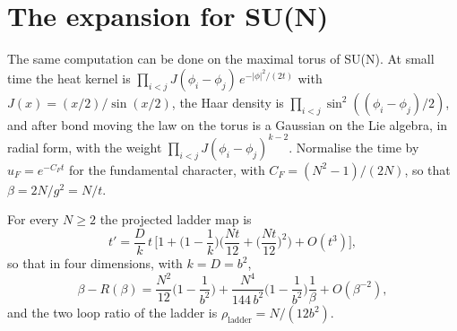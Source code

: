 \section{The expansion for SU(N)}

The same computation can be done on the maximal torus of SU(N). At small time the heat kernel is $\prod_{i<j}J(\phi_i-\phi_j)\,e^{-|\phi|^2/(2t)}$ with $J(x)=(x/2)/\sin(x/2)$, the Haar density is $\prod_{i<j}\sin^2((\phi_i-\phi_j)/2)$, and after bond moving the law on the torus is a Gaussian on the Lie algebra, in radial form, with the weight $\prod_{i<j}J(\phi_i-\phi_j)^{k-2}$. Normalise the time by $u_F=e^{-C_Ft}$ for the fundamental character, with $C_F=(N^2-1)/(2N)$, so that $\beta=2N/g^2=N/t$.

\begin{theorem}\label{thm:expansionN}
For every $N\ge2$ the projected ladder map is
\[
t'=\frac Dk\,t\,\Big[1+\Big(1-\frac1k\Big)\Big(\frac{Nt}{12}+\Big(\frac{Nt}{12}\Big)^2\Big)+O(t^3)\Big],
\]
so that in four dimensions, with $k=D=b^2$,
\[
\beta-R(\beta)=\frac{N^2}{12}\Big(1-\frac1{b^2}\Big)+\frac{N^4}{144\,b^2}\Big(1-\frac1{b^2}\Big)\frac1\beta+O(\beta^{-2}),
\]
and the two loop ratio of the ladder is $\rho_{\mathrm{ladder}}=N/(12b^2)$.
\end{theorem}

